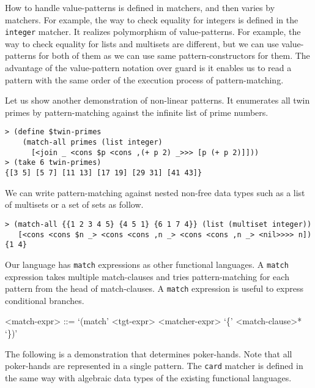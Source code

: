 \documentclass{article}
\begin{document}
How to handle value-patterns is defined in matchers, and then varies by matchers.
For example, the way to check equality for integers is defined in the \texttt{integer} matcher.
It realizes polymorphism of value-patterns.
For example, the way to check equality for lists and multisets are different, but we can use value-patterns for both of them as we can use same pattern-constructors for them.
The advantage of the value-pattern notation over guard is it enables us to read a pattern with the same order of the execution process of pattern-matching.

Let us show another demonstration of non-linear patterns.
It enumerates all twin primes by pattern-matching against the infinite list of prime numbers.

{\footnotesize
\begin{verbatim}
> (define $twin-primes
    (match-all primes (list integer)
      [<join _ <cons $p <cons ,(+ p 2) _>>> [p (+ p 2)]]))
> (take 6 twin-primes)
{[3 5] [5 7] [11 13] [17 19] [29 31] [41 43]}
\end{verbatim}
}

We can write pattern-matching against nested non-free data types such as a list of multisets or a set of sets as follow.

{\footnotesize
\begin{verbatim}
> (match-all {{1 2 3 4 5} {4 5 1} {6 1 7 4}} (list (multiset integer))
   [<cons <cons $n _> <cons <cons ,n _> <cons <cons ,n _> <nil>>>> n])
{1 4}
\end{verbatim}
}

Our language has \texttt{match} expressions as other functional languages.
A \texttt{match} expression takes multiple match-clauses and tries pattern-matching for each pattern from the head of match-clauses.
A \texttt{match} expression is useful to express conditional branches.

\begin{grammar}
<match-expr> ::= `(match' <tgt-expr> <matcher-expr> `\{' <match-clause>* `\})' 
\end{grammar}

The following is a demonstration that determines poker-hands.
Note that all poker-hands are represented in a single pattern.
The \texttt{card} matcher is defined in the same way with algebraic data types of the existing functional languages.
\end{document}
